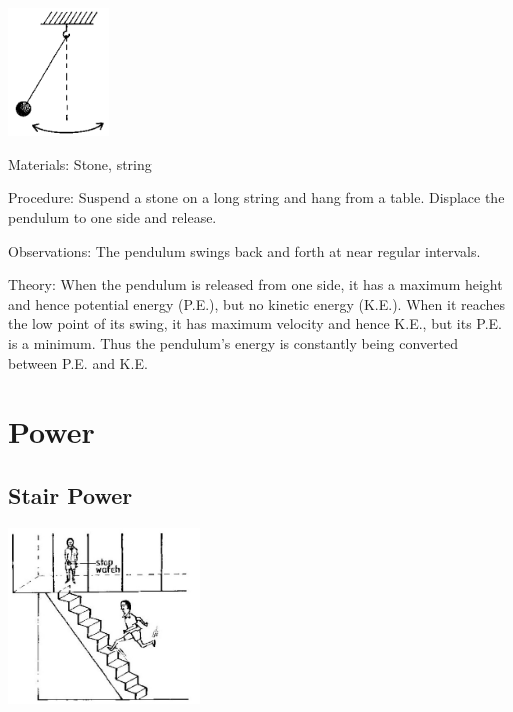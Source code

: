 \begin{multicols}{2}
\begin{center}
\includegraphics[width=0.2\textwidth]{./img/source/pendulum.png}
\end{center}

\begin{description*}
\item[Materials:]{Stone, string}
\item[Procedure:]{Suspend a stone on a long string and hang from a table. Displace the pendulum to one side and release.}
\item[Observations:]{The pendulum swings back and forth at near regular intervals.}
\item[Theory:]{When the pendulum is released from one side, it has a maximum height and hence potential energy (P.E.), but no kinetic energy (K.E.). When it reaches the low point of its swing, it has maximum velocity and hence K.E., but its P.E. is a minimum. Thus the pendulum's energy is constantly being converted between P.E. and K.E.}
\end{description*}


\section*{Power} 


\subsection{Stair Power}

\begin{center}
\includegraphics[width=0.38\textwidth]{./img/source/power-2.jpg}
\end{center}


\end{multicols}
